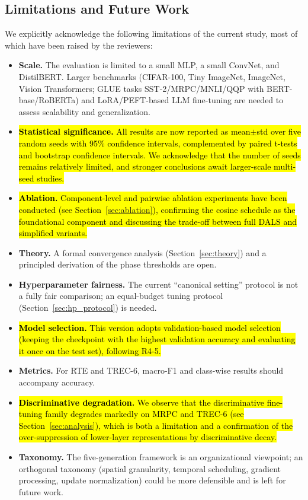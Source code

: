 \documentclass[a4paper,fleqn]{cas-dc}
\begin{document}
\subsection{Limitations and Future Work}\label{sec:limitations}

We explicitly acknowledge the following limitations of the current study, most of which have been raised by the reviewers:
\begin{itemize}
\item \textbf{Scale.} The evaluation is limited to a small MLP, a small ConvNet, and DistilBERT. Larger benchmarks (CIFAR-100, Tiny ImageNet, ImageNet, Vision Transformers; GLUE tasks SST-2/MRPC/MNLI/QQP with BERT-base/RoBERTa) and LoRA/PEFT-based LLM fine-tuning are needed to assess scalability and generalization.
\item \hl{\textbf{Statistical significance.} All results are now reported as mean$\pm$std over five random seeds with 95\% confidence intervals, complemented by paired t-tests and bootstrap confidence intervals. We acknowledge that the number of seeds remains relatively limited, and stronger conclusions await larger-scale multi-seed studies.}
\item \hl{\textbf{Ablation.} Component-level and pairwise ablation experiments have been conducted (see Section~\ref{sec:ablation}), confirming the cosine schedule as the foundational component and discussing the trade-off between full DALS and simplified variants.}
\item \textbf{Theory.} A formal convergence analysis (Section~\ref{sec:theory}) and a principled derivation of the phase thresholds are open.
\item \textbf{Hyperparameter fairness.} The current ``canonical setting'' protocol is not a fully fair comparison; an equal-budget tuning protocol (Section~\ref{sec:hp_protocol}) is needed.
\item \hl{\textbf{Model selection.} This version adopts validation-based model selection (keeping the checkpoint with the highest validation accuracy and evaluating it once on the test set), following R4-5.}
\item \textbf{Metrics.} For RTE and TREC-6, macro-F1 and class-wise results should accompany accuracy.
\item \hl{\textbf{Discriminative degradation.} We observe that the discriminative fine-tuning family degrades markedly on MRPC and TREC-6 (see Section~\ref{sec:analysis}), which is both a limitation and a confirmation of the over-suppression of lower-layer representations by discriminative decay.}
\item \textbf{Taxonomy.} The five-generation framework is an organizational viewpoint; an orthogonal taxonomy (spatial granularity, temporal scheduling, gradient processing, update normalization) could be more defensible and is left for future work.
\end{itemize}
\end{document}
